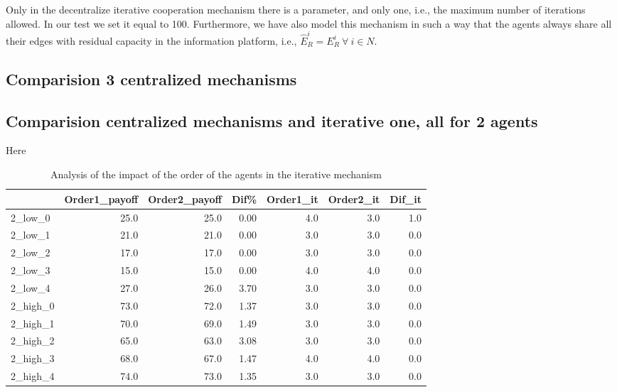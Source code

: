 \documentclass[review]{elsarticle}
\begin{document}
Only in the decentralize iterative cooperation mechanism there is a parameter, and only one, i.e., the maximum number of iterations allowed. In our test we set it equal to 100. Furthermore, we have also model this mechanism in such a way that the agents always share all their edges with residual capacity in the information platform, i.e., $\widehat{E}_R^i=E_R^i\ \forall\ i\in N$.

\subsection{Comparision 3 centralized mechanisms}

\subsection{Comparision centralized mechanisms and iterative one, all for 2 agents}

Here

\begin{table}[ht!]
\caption{Analysis of the impact of the order of the agents in the iterative mechanism \label{tb:iter_order_comparition}}
\begin{tabular}{lrrrrrr}
\toprule
{} &  Order1\_payoff &  Order2\_payoff &      Dif\% &  Order1\_it &  Order2\_it &  Dif\_it \\
\midrule
2\_low\_0  &           25.0 &           25.0 &  0.00 &        4.0 &        3.0 &     1.0 \\
2\_low\_1  &           21.0 &           21.0 &  0.00 &        3.0 &        3.0 &     0.0 \\
2\_low\_2  &           17.0 &           17.0 &  0.00 &        3.0 &        3.0 &     0.0 \\
2\_low\_3  &           15.0 &           15.0 &  0.00 &        4.0 &        4.0 &     0.0 \\
2\_low\_4  &           27.0 &           26.0 &  3.70 &        3.0 &        3.0 &     0.0 \\
2\_high\_0 &           73.0 &           72.0 &  1.37 &        3.0 &        3.0 &     0.0 \\
2\_high\_1 &           70.0 &           69.0 &  1.49 &        3.0 &        3.0 &     0.0 \\
2\_high\_2 &           65.0 &           63.0 &  3.08 &        3.0 &        3.0 &     0.0 \\
2\_high\_3 &           68.0 &           67.0 &  1.47 &        4.0 &        4.0 &     0.0 \\
2\_high\_4 &           74.0 &           73.0 &  1.35 &        3.0 &        3.0 &     0.0 \\
\bottomrule
\end{tabular}
\end{table}
\end{document}
